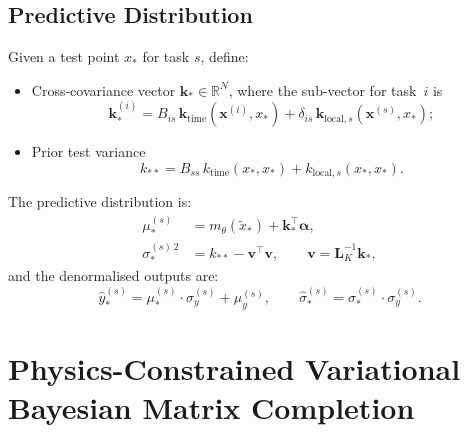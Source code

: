 \documentclass[11pt,a4paper]{article}
\newcommand{\R}{\mathbb{R}}
\begin{document}
\subsection{Predictive Distribution}
\label{sec:gp_prediction}
Given a test point $x_*$ for task $s$, define:
\begin{itemize}[nosep]
  \item Cross-covariance vector $\bm{k}_* \in \R^{N}$, where the sub-vector for task~$i$ is
  \begin{equation}
    \bm{k}_*^{(i)}
    = B_{is}\, \bm{k}_{\text{time}}(\bm{x}^{(i)}, x_*)
    + \delta_{is}\, \bm{k}_{\text{local},s}(\bm{x}^{(s)}, x_*);
  \end{equation}
  \item Prior test variance
  \begin{equation}
    k_{**} = B_{ss}\, k_{\text{time}}(x_*,x_*) + k_{\text{local},s}(x_*,x_*).
  \end{equation}
\end{itemize}

The predictive distribution is:
\begin{align}
  \mu_*^{(s)} &= m_\theta(\tilde{x}_*) + \bm{k}_*^\top \bm{\alpha}, \label{eq:pred_mean}\\
  \sigma_*^{(s)\,2} &= k_{**} - \bm{v}^\top \bm{v},
  \qquad \bm{v} = \bm{L}_K^{-1}\bm{k}_*, \label{eq:pred_var}
\end{align}
and the denormalised outputs are:
\begin{equation}\label{eq:denorm}
  \hat{y}_*^{(s)} = \mu_*^{(s)} \cdot \sigma_y^{(s)} + \mu_y^{(s)},
  \qquad
  \hat{\sigma}_*^{(s)} = \sigma_*^{(s)} \cdot \sigma_y^{(s)}.
\end{equation}

\section{Physics-Constrained Variational Bayesian Matrix Completion}
\label{sec:bmc}
\end{document}
